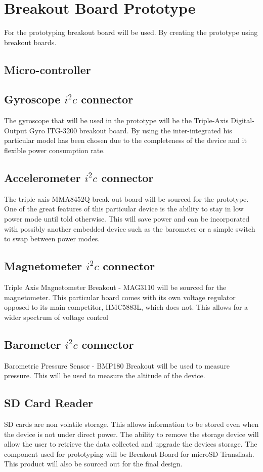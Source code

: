 \documentclass{report}
\begin{document}
\section{Breakout Board Prototype}
For the prototyping breakout board will be used. By creating the prototype using breakout boards. 
 
\subsection{Micro-controller}

\subsection{Gyroscope $i^2c$ connector}
The gyroscope that will be used in the prototype will be the Triple-Axis Digital-Output Gyro ITG-3200 breakout board. By using the inter-integrated 
 his particular model has been chosen due to the completeness of the device and it flexible power consumption rate.
\subsection{Accelerometer $i^2c$ connector}
The triple axis MMA8452Q break out board will be sourced for the prototype. One of the great features of this particular device is the ability to stay in low power mode until told otherwise. This will save power and can be incorporated with possibly another embedded device such as the barometer or a simple switch to swap between power modes.
\subsection{Magnetometer $i^2c$ connector}
Triple Axis Magnetometer Breakout - MAG3110 will be sourced for the magnetometer. This particular board comes with its own voltage regulator opposed to its main competitor, HMC5883L, which does not. This allows for a wider spectrum of voltage control 
\subsection{Barometer $i^2c$ connector}
Barometric Pressure Sensor - BMP180 Breakout will be used to measure pressure. This will be used to measure the altitude of the device. 
\subsection{SD Card Reader}
SD cards are non volatile storage. This allows information to be stored even when the device is not under direct power. The ability to remove the storage device will allow the user to retrieve the data collected and upgrade the devices storage. The component used for prototyping will be Breakout Board for microSD Transflash. This product will also be sourced out for the final design.
\end{document}
